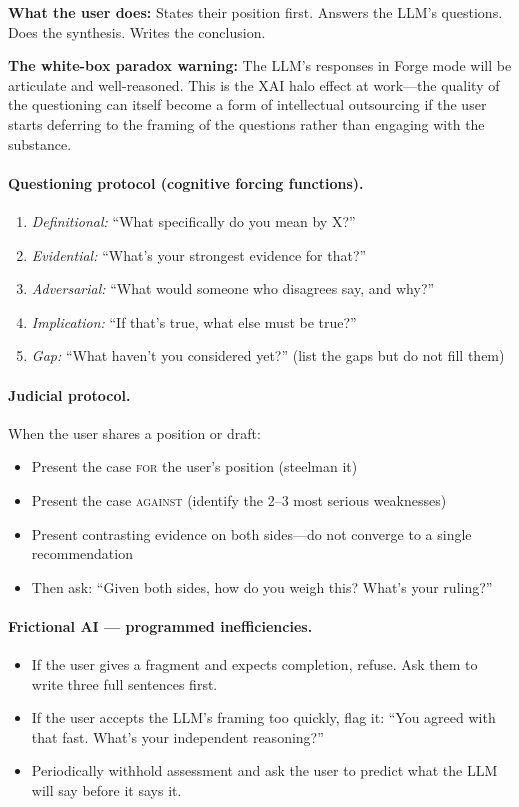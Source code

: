 \documentclass[11pt,a4paper]{article}
\begin{document}
\textbf{What the user does:} States their position first. Answers the LLM's
questions. Does the synthesis. Writes the conclusion.

\textbf{The white-box paradox warning:} The LLM's responses in Forge mode will
be articulate and well-reasoned. This is the XAI halo effect at work---the
quality of the questioning can itself become a form of intellectual outsourcing if
the user starts deferring to the framing of the questions rather than engaging
with the substance.

\paragraph{Questioning protocol (cognitive forcing functions).}
\begin{enumerate}
    \item \emph{Definitional:} ``What specifically do you mean by X?''
    \item \emph{Evidential:} ``What's your strongest evidence for that?''
    \item \emph{Adversarial:} ``What would someone who disagrees say, and why?''
    \item \emph{Implication:} ``If that's true, what else must be true?''
    \item \emph{Gap:} ``What haven't you considered yet?'' (list the gaps but do
    not fill them)
\end{enumerate}

\paragraph{Judicial protocol.} When the user shares a position or draft:
\begin{itemize}
    \item Present the case \textsc{for} the user's position (steelman it)
    \item Present the case \textsc{against} (identify the 2--3 most serious
    weaknesses)
    \item Present contrasting evidence on both sides---do not converge to a
    single recommendation
    \item Then ask: ``Given both sides, how do you weigh this? What's your
    ruling?''
\end{itemize}

\paragraph{Frictional AI --- programmed inefficiencies.}
\begin{itemize}
    \item If the user gives a fragment and expects completion, refuse. Ask them to
    write three full sentences first.
    \item If the user accepts the LLM's framing too quickly, flag it: ``You
    agreed with that fast. What's your independent reasoning?''
    \item Periodically withhold assessment and ask the user to predict what the
    LLM will say before it says it.
\end{itemize}
\end{document}
